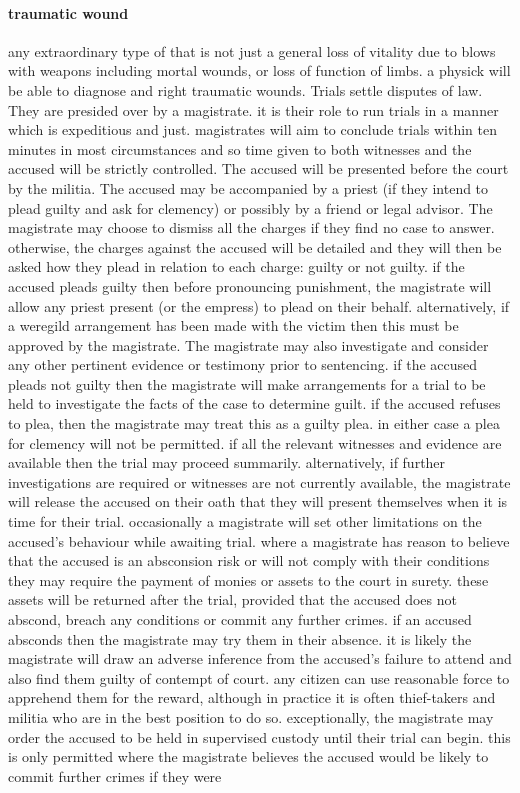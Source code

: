 \paragraph{traumatic wound} any extraordinary type of  that is not just a general loss of vitality due to blows with weapons including mortal wounds, or loss of function of limbs. a physick will be able to diagnose and right traumatic wounds.
 Trials settle disputes of law. They are presided over by a magistrate. it is their role to run trials in a manner which is expeditious and just. magistrates will aim to conclude trials within ten minutes in most circumstances and so time given to both witnesses and the accused will be strictly controlled. \localpar {} The accused will be presented before the court by the militia. The accused may be accompanied by a priest (if they intend to plead guilty and ask for clemency) or possibly by a friend or legal advisor. The magistrate may choose to dismiss all the charges if they find no case to answer. otherwise, the charges against the accused will be detailed and they will then be asked how they plead in relation to each charge: guilty or not guilty. if the accused pleads guilty then before pronouncing punishment, the magistrate will allow any priest present (or the empress) to plead  on their behalf. alternatively, if a weregild arrangement has been made with the victim then this must be approved by the magistrate. \localpar The magistrate may also investigate and consider any other pertinent evidence or testimony prior to sentencing. if the accused pleads not guilty then the magistrate will make arrangements for a trial to be held to investigate the facts of the case to determine guilt. if the accused refuses to plea, then the magistrate may treat this as a guilty plea. in either case a plea for clemency will not be permitted. if all the relevant witnesses and evidence are available then the trial may proceed summarily. alternatively, if further investigations are required or witnesses are not currently available, the magistrate will release the accused on their oath that they will present themselves when it is time for their trial. occasionally a magistrate will set other limitations on the accused’s behaviour while awaiting trial. where a magistrate has reason to believe that the accused is an absconsion risk or will not comply with their conditions they may require the payment of monies or assets to the court in surety. these assets will be returned after the trial, provided that the accused does not abscond, breach any conditions or commit any further crimes. if an accused absconds then the magistrate may try them in their absence. it is likely the magistrate will draw an adverse inference from the accused's failure to attend and also find them guilty of contempt of court. any citizen can use reasonable force to apprehend them for the reward, although in practice it is often thief-takers and militia who are in the best position to do so. exceptionally, the magistrate may order the accused to be held in supervised custody until their trial can begin. this is only permitted where the magistrate believes the accused would be likely to commit further crimes if they were 